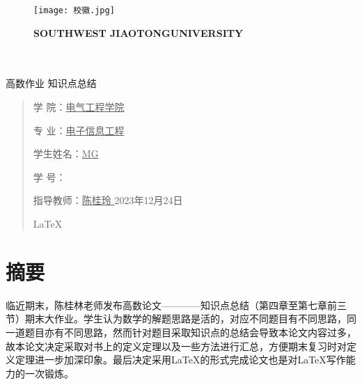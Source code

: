 \documentclass[12pt, a4paper, oneside]{ctexart}
\date{}
\newcommand\myemptypage{
    \null
    \thispagestyle{empty}
    \addtocounter{page}{-1}
    \newpage
    }
\begin{document}
    
	\begin{figure}[t]
		\parbox[b]{2cm}{
			\texttt{[image: 校徽.jpg]}
			}
            \parbox[b]{9cm}{
                \begin{center}
                    

				\small \textbf{\quad \quad \quad SOUTHWEST JIAOTONG\quad UNIVERSITY} 
			\end{center}
			}
	\end{figure}

	\begin{center}
		\quad \\
		\quad \\
		\heiti \fontsize{45}{17} 高\quad 数\quad 作\quad 业
		\vskip 3.5cm
		\heiti {} 知识点总结	
	\end{center}
	\vskip 3.5cm

	\begin{quotation}
		\songti \fontsize{15}{15}
		\doublespacing
		\par\setlength\parindent{12em}
		\quad 
        
	    学\hspace{0.61cm} 院：\underline{电气工程学院\quad}
        
	    专\hspace{0.61cm} 业：\underline{电子信息工程}
        
	    学生姓名：\underline{\qquad MG\qquad }
        
	    学\hspace{0.61cm} 号：\underline{\quad}

	    指导教师：\underline{\qquad 陈桂玲 \qquad}
		\vskip 2cm
		\centering
		2023年12月24日
		
        \centering
        \LaTeX
	\end{quotation}

	\newpage
	\myemptypage

    \tableofcontents

    \newpage
	\myemptypage

\section{摘要}
临近期末，陈桂林老师发布高数论文————知识点总结（第四章至第七章前三节）期末大作业。学生认为数学的解题思路是活的，对应不同题目有不同思路，同一道题目亦有不同思路，然而针对题目采取知识点的总结会导致本论文内容过多，故本论文决定采取对书上的定义定理以及一些方法进行汇总，方便期末复习时对定义定理进一步加深印象。最后决定采用\LaTeX 的形式完成论文也是对\LaTeX 写作能力的一次锻炼。
\vskip 2cm
\end{document}
